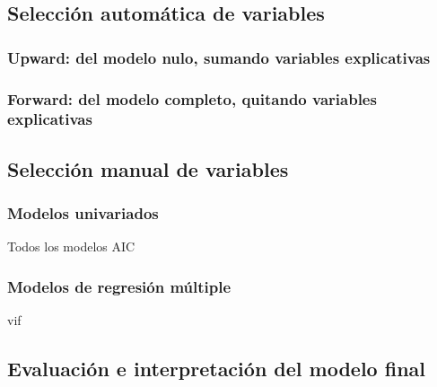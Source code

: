 \documentclass[
]{book}
\begin{document}
\hypertarget{selecciuxf3n-automuxe1tica-de-variables}{%
\subsection{Selección automática de variables}\label{selecciuxf3n-automuxe1tica-de-variables}}

\hypertarget{upward-del-modelo-nulo-sumando-variables-explicativas}{%
\subsubsection{Upward: del modelo nulo, sumando variables explicativas}\label{upward-del-modelo-nulo-sumando-variables-explicativas}}

\hypertarget{forward-del-modelo-completo-quitando-variables-explicativas}{%
\subsubsection{Forward: del modelo completo, quitando variables explicativas}\label{forward-del-modelo-completo-quitando-variables-explicativas}}

\hypertarget{selecciuxf3n-manual-de-variables}{%
\subsection{Selección manual de variables}\label{selecciuxf3n-manual-de-variables}}

\hypertarget{modelos-univariados}{%
\subsubsection{Modelos univariados}\label{modelos-univariados}}

Todos los modelos
AIC

\hypertarget{modelos-de-regresiuxf3n-muxfaltiple}{%
\subsubsection{Modelos de regresión múltiple}\label{modelos-de-regresiuxf3n-muxfaltiple}}

vif

\hypertarget{evaluaciuxf3n-e-interpretaciuxf3n-del-modelo-final}{%
\subsection{Evaluación e interpretación del modelo final}\label{evaluaciuxf3n-e-interpretaciuxf3n-del-modelo-final}}
\end{document}
